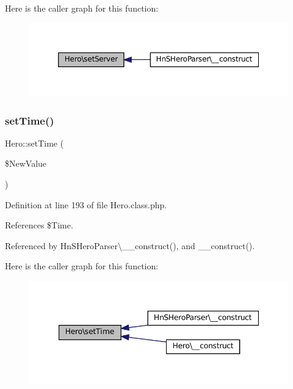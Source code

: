 Here is the caller graph for this function\+:\nopagebreak
\begin{figure}[H]
\begin{center}
\leavevmode
\includegraphics[width=350pt]{class_hero_a4b70e6c2741977f8561adf943606bdea_icgraph}
\end{center}
\end{figure}
\mbox{\label{class_hero_ac0567d3179edcda779547013ffa8e3a8}} 
\subsubsection{\texorpdfstring{set\+Time()}{setTime()}}
{\footnotesize\ttfamily Hero\+::set\+Time (\begin{DoxyParamCaption}\item[{}]{\$\+New\+Value }\end{DoxyParamCaption})}



Definition at line 193 of file Hero.\+class.\+php.



References \$\+Time.



Referenced by Hn\+S\+Hero\+Parser\textbackslash{}\+\_\+\+\_\+construct(), and \+\_\+\+\_\+construct().

Here is the caller graph for this function\+:\nopagebreak
\begin{figure}[H]
\begin{center}
\leavevmode
\includegraphics[width=347pt]{class_hero_ac0567d3179edcda779547013ffa8e3a8_icgraph}
\end{center}
\end{figure}
\mbox{\label{class_hero_a38ffcafb45800d2895a8bcf6ffde23e9}} 
